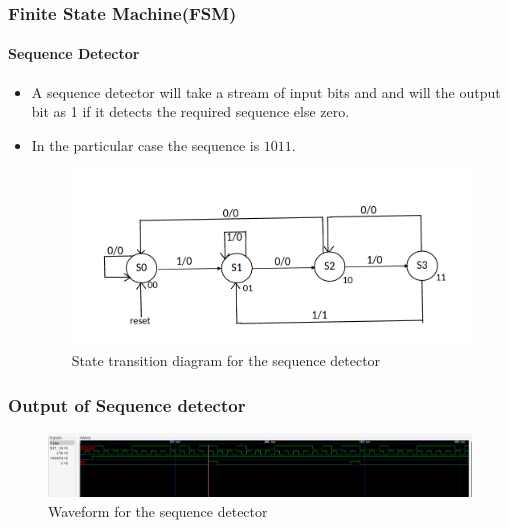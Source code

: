 \documentclass{beamer}
\begin{document}
\begin{frame}
	\frametitle{Finite State Machine(FSM)}
	\framesubtitle{Sequence Detector}
	\begin{itemize}
		\item A sequence detector will take a stream of input bits and and will the output bit as 1 if it detects the required sequence else zero.
		\item In the particular case the sequence is $1011$.
		\begin{figure}[h!]
  		\centering
    			\includegraphics[width=0.7\linewidth]{./figs/FSM.png}
		\caption{State transition diagram for the sequence detector}
		\end{figure}	
	\end{itemize}
\end{frame}

\begin{frame}
	\frametitle{Output of Sequence detector}
		\begin{figure}[h!]
  		\centering
    			\includegraphics[width=\linewidth]{./figs/seq_detector.png}
		\caption{Waveform for the sequence detector}
		\end{figure}	
\end{frame}
\end{document}
